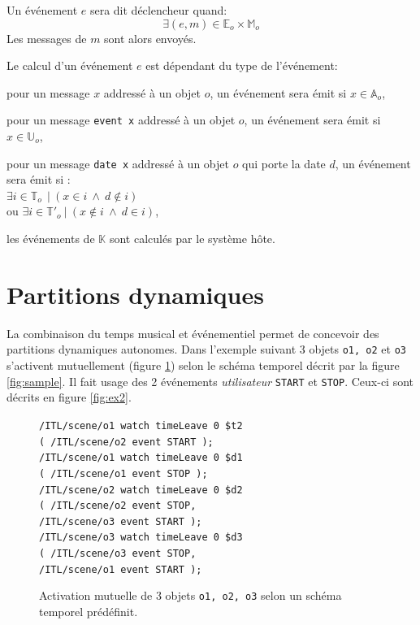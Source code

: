 \documentclass{article}
\newcommand{\OSC}[1]	{{\fontsize{9pt}{9pt} \selectfont\texttt{#1}}}
\let\olditemize\itemize
\let\oldenditemize\enditemize
\renewenvironment{itemize} 	{\olditemize \renewcommand{\labelitemi}{$\bullet$} \setlength{\itemsep}{0mm}}{\oldenditemize}
\newcommand{\sample}[1]		{\vspace{-0.2em}\begin{center}\colorbox{mygrey}{\begin{minipage}[t]{0.98\columnwidth} {\small \texttt{#1}}\end{minipage}}\end{center}}
\begin{document}
Un événement $e$ sera dit déclencheur quand:
\[
	\exists (e, m) \in \mathbb{E}_o \times \mathbb{M}_o  
\] 
Les messages de $m$ sont alors envoyés.

Le calcul d'un événement $e$ est dépendant du type de l'événement:
\begin{itemize}
\item[-] pour un message $x$ addressé à un objet $o$, un événement sera émit si $x \in \mathbb{A}_o$, 
\item[-] pour un message \OSC{event x} addressé à un objet $o$, un événement sera émit si $x \in \mathbb{U}_o$,
\item[-] pour un message \OSC{date x} addressé à un objet $o$ qui porte la date $d$, un événement sera émit si :\\ 
\hspace*{3.5mm} $\exists i \in \mathbb{T}_o\ \ |\ (x \in i\ \land\ d \not\in i)$ \\
ou $\exists i \in \mathbb{T'}_o\ |\ (x \not \in i\ \land\ d \in i)$,
\item[-] les événements de $\mathbb{K}$ sont calculés par le système hôte.
\end{itemize}


\section{Partitions dynamiques}

La combinaison du temps musical et événementiel permet de concevoir des partitions dynamiques autonomes. Dans l'exemple suivant 3 objets \OSC{o1, o2} et \OSC{o3} s'activent mutuellement (figure \ref{fig:ex1}) selon le schéma temporel décrit par la figure \ref{fig:sample}. Il fait usage des 2 événements \emph{utilisateur} \OSC{START} et \OSC{STOP}. Ceux-ci sont décrits en figure \ref{fig:ex2}.

\begin{figure}[h]
   \centering
\sample{/ITL/scene/o1 watch timeLeave 0 \$t2 \\
   \hspace*{4mm}( /ITL/scene/o2 event START );\\
	/ITL/scene/o1 watch timeLeave 0 \$d1 \\
	\hspace*{4mm}( /ITL/scene/o1 event STOP );\\
	/ITL/scene/o2 watch timeLeave 0 \$d2 \\
	\hspace*{4mm}( /ITL/scene/o2 event STOP, \\
	\hspace*{8mm}/ITL/scene/o3 event START );\\
	/ITL/scene/o3 watch timeLeave 0 \$d3 \\
	\hspace*{4mm}( /ITL/scene/o3 event STOP, \\
	\hspace*{8mm}/ITL/scene/o1 event START );
}
   \caption{Activation mutuelle de 3 objets \OSC{o1, o2, o3} selon un schéma temporel prédéfinit.}
   \label{fig:ex1}
\end{figure}
\end{document}

